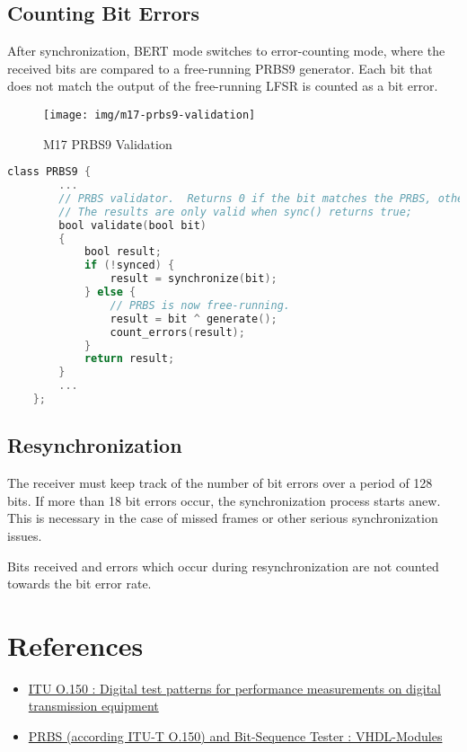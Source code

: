 \documentclass[a4paper,11pt,oneside]{book}
\begin{document}
\subsection{Counting Bit Errors}

After synchronization, BERT mode switches to error-counting mode, where the received bits are compared to a free-running PRBS9 generator. Each bit that does not match the output of the free-running LFSR is counted as a bit error.

\begin{figure}[H]
	\centering
	\texttt{[image: img/m17-prbs9-validation]}
	\caption{M17 PRBS9 Validation}
	\label{fig:m17-prbs9-validation}
\end{figure}

\begin{lstlisting}[language=C]
	class PRBS9 {
		...
		// PRBS validator.  Returns 0 if the bit matches the PRBS, otherwise 1.
		// The results are only valid when sync() returns true;
		bool validate(bool bit)
		{
			bool result;
			if (!synced) {
				result = synchronize(bit);
			} else {
				// PRBS is now free-running.
				result = bit ^ generate();
				count_errors(result);
			}
			return result;
		}
		...
	};
\end{lstlisting}

\subsection{Resynchronization}

The receiver must keep track of the number of bit errors over a period of 128 bits. If more than 18 bit errors occur, the synchronization process starts anew. This is necessary in the case of missed frames or other serious synchronization issues.

Bits received and errors which occur during resynchronization are not counted towards the bit error rate.

\section{References}

\begin{itemize}
	\item
	\href{http://www.itu.int/rec/T-REC-O.150-199210-S}{ITU O.150 : Digital 	test patterns for performance measurements on digital transmission 	equipment}
	\item
	\href{http://www.pldworld.com/_hdl/5/-thorsten-gaertner.de/vhdl/PRBS.pdf}{PRBS
	(according ITU-T O.150) and Bit-Sequence Tester : VHDL-Modules}
\end{itemize}
\end{document}
